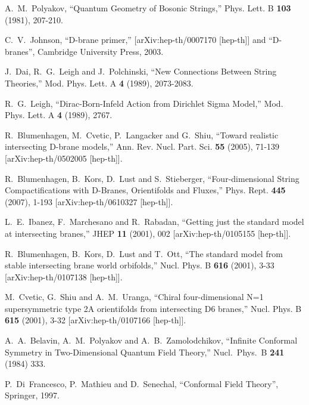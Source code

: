 \documentclass[12pt]{article}
\numberwithin{equation}{section}
\begin{document}
\begin{thebibliography}{999}
A.~M.~Polyakov,
``Quantum Geometry of Bosonic Strings,''
Phys. Lett. B \textbf{103} (1981), 207-210.

C.~V.~Johnson,
``D-brane primer,''
[arXiv:hep-th/0007170 [hep-th]] and ``D-branes'', Cambridge University Press, 2003.

J.~Dai, R.~G.~Leigh and J.~Polchinski,
``New Connections Between String Theories,''
Mod. Phys. Lett. A \textbf{4} (1989), 2073-2083.

R.~G.~Leigh,
``Dirac-Born-Infeld Action from Dirichlet Sigma Model,''
Mod. Phys. Lett. A \textbf{4} (1989), 2767.

R.~Blumenhagen, M.~Cvetic, P.~Langacker and G.~Shiu,
``Toward realistic intersecting D-brane models,''
Ann. Rev. Nucl. Part. Sci. \textbf{55} (2005), 71-139
[arXiv:hep-th/0502005 [hep-th]].

R.~Blumenhagen, B.~Kors, D.~Lust and S.~Stieberger,
``Four-dimensional String Compactifications with D-Branes, Orientifolds and Fluxes,''
Phys. Rept. \textbf{445} (2007), 1-193
[arXiv:hep-th/0610327 [hep-th]].

L.~E.~Ibanez, F.~Marchesano and R.~Rabadan,
``Getting just the standard model at intersecting branes,''
JHEP \textbf{11} (2001), 002
[arXiv:hep-th/0105155 [hep-th]].

R.~Blumenhagen, B.~Kors, D.~Lust and T.~Ott,
``The standard model from stable intersecting brane world orbifolds,''
Nucl. Phys. B \textbf{616} (2001), 3-33
[arXiv:hep-th/0107138 [hep-th]].

M.~Cvetic, G.~Shiu and A.~M.~Uranga,
``Chiral four-dimensional N=1 supersymmetric type 2A orientifolds from intersecting D6 branes,''
Nucl. Phys. B \textbf{615} (2001), 3-32
[arXiv:hep-th/0107166 [hep-th]].

  A.~A.~Belavin, A.~M.~Polyakov and A.~B.~Zamolodchikov,
  ``Infinite Conformal Symmetry in Two-Dimensional Quantum Field Theory,''
  Nucl.\ Phys.\ B {\bf 241} (1984) 333.

 P.~Di~Francesco, P.~Mathieu and D.~Senechal, ``Conformal Field Theory'', Springer, 1997.


\end{thebibliography}
\end{document}
